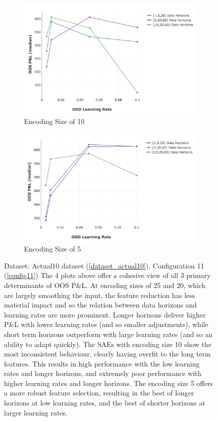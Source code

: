 \documentclass[a4paper,11pt,oneside]{article}
\theoremstyle{plain}
\theoremstyle{definition}
\begin{document}
\begin{figure}[H]
			\begin{subfigure}{0.44\linewidth}
				\centering\includegraphics[scale=0.3]{images/results/primary/OOS_OGDLR_Delta_Encoding_10_median.png}
				\caption{Encoding Size of 10}
			\end{subfigure}%
			\begin{subfigure}{0.49\linewidth}
				\centering\includegraphics[scale=0.3]{images/results/primary/OOS_OGDLR_Delta_Encoding_5_median.png}
				\caption{Encoding Size of 5}
			\end{subfigure}
		\caption[OOS P\&L By Feature Selection Size, OGD Learning Rate and Data Horizons]
		{Dataset: Actual10 dataset (\ref{dataset_actual10}), Configuration 11 (\ref{config11})		
			\newline The 4 plots above offer a cohesive view of all 3 primary determinants of OOS P\&L. At encoding sizes of 25 and 20, which are largely smoothing the input, the feature reduction has less material impact and so the relation between data horizons and learning rates are more prominent. Longer horizons deliver higher P\&L with lower learning rates (and so smaller adjustments), while short term horizons outperform with large learning rates (and so an ability to adapt quickly). The SAEs with encoding size 10 show the most inconsistent behaviour, clearly having overfit to the long term features. This results in high performance with the low learning rates and longer horizons, and extremely poor performance with higher learning rates and longer horizons. The encoding size 5 offers a more robust feature selection, resulting in the best of longer horizons at low learning rates, and the best of shorter horizons at larger learning rates.}

\end{figure}
\end{document}
